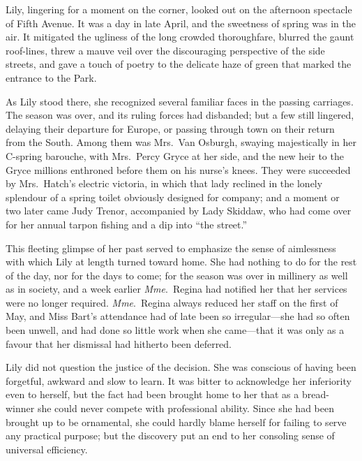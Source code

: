 \documentclass[12pt,a4paper]{book}
\begin{document}





Lily, lingering for a moment on the corner, looked out on the
afternoon spectacle of Fifth Avenue. It was a day in late April,
and the sweetness of spring was in the air. It mitigated the
ugliness of the long crowded thoroughfare, blurred the gaunt
roof-lines, threw a mauve veil over the discouraging perspective
of the side streets, and gave a touch of poetry to the delicate
haze of green that marked the entrance to the Park.





As Lily stood there, she recognized several familiar faces in the
passing carriages. The season was over, and its ruling forces had
disbanded; but a few still lingered, delaying their departure for
Europe, or passing through town on their return from the South. 
Among them was Mrs.\ Van Osburgh, swaying majestically in her
C-spring barouche, with Mrs.\ Percy Gryce at her side, and the new
heir to the Gryce millions enthroned before them on his nurse's
knees. They were succeeded by Mrs.\ Hatch's electric victoria, in
which that lady reclined in the lonely splendour of a spring
toilet obviously designed for company; and a moment or two later
came Judy Trenor, accompanied by Lady Skiddaw, who had come over
for her annual tarpon fishing and a dip into ``the street.''





This fleeting glimpse of her past served to emphasize the sense
of aimlessness with which Lily at length turned toward home. She
had nothing to do for the rest of the day, nor for the days to
come; for the season was over in millinery as well as in society,
and a week earlier \textit{Mme}.\ Regina had notified her that her services
were no longer required. \textit{Mme}.\ Regina always reduced her staff on
the first of May, and Miss Bart's attendance had of late been so
irregular---she had so often been unwell, and had done so little
work when she came---that it was only as a favour that her
dismissal had hitherto been deferred.





Lily did not question the justice of the decision. She was
conscious of having been forgetful, awkward and slow to learn. It
was bitter to acknowledge her inferiority even to herself, but
the fact had been brought home to her that as a
bread-winner she could never compete with professional ability. 
Since she had been brought up to be ornamental, she could hardly
blame herself for failing to serve any practical purpose; but the
discovery put an end to her consoling sense of universal
efficiency.
\end{document}
